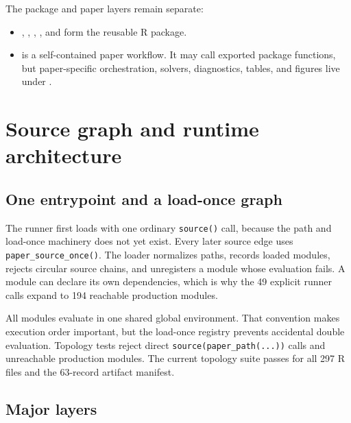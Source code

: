 \documentclass[11pt]{article}
\begin{document}
The package and paper layers remain separate:

\begin{itemize}[leftmargin=1.5em]
  \item {}, , , , and 
    form the reusable R package.
  \item {} is a self-contained paper workflow. It may call
    exported package functions, but paper-specific orchestration, solvers,
    diagnostics, tables, and figures live under .
\end{itemize}

\section{Source graph and runtime architecture}

\subsection{One entrypoint and a load-once graph}

The runner first loads  with one ordinary
\texttt{source()} call, because the path and load-once machinery does not yet
exist. Every later source edge uses \texttt{paper\_source\_once()}. The loader
normalizes paths, records loaded modules, rejects circular source chains, and
unregisters a module whose evaluation fails. A module can declare its own
dependencies, which is why the 49 explicit runner calls expand to 194
reachable production modules.

All modules evaluate in one shared global environment. That convention makes
execution order important, but the load-once registry prevents accidental
double evaluation. Topology tests reject direct
\texttt{source(paper\_path(...))} calls and unreachable production modules.
The current topology suite passes for all 297 R files and the 63-record
artifact manifest.

\subsection{Major layers}
\end{document}
